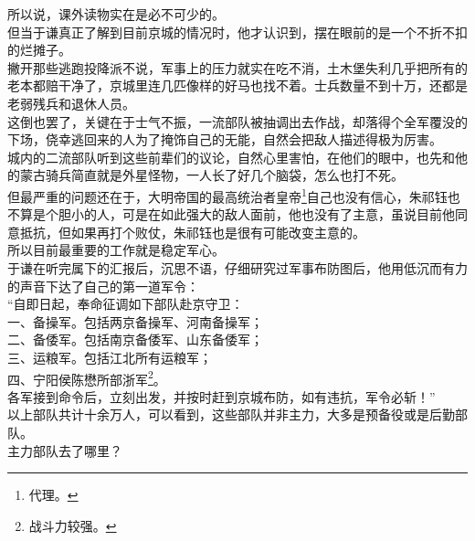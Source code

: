 \begin{multicols}{\theparacolNo}
所以说，课外读物实在是必不可少的。\\

但当于谦真正了解到目前京城的情况时，他才认识到，摆在眼前的是一个不折不扣的烂摊子。\\

撇开那些逃跑投降派不说，军事上的压力就实在吃不消，土木堡失利几乎把所有的老本都赔干净了，京城里连几匹像样的好马也找不着。士兵数量不到十万，还都是老弱残兵和退休人员。\\

这倒也罢了，关键在于士气不振，一流部队被抽调出去作战，却落得个全军覆没的下场，侥幸逃回来的人为了掩饰自己的无能，自然会把敌人描述得极为厉害。\\

城内的二流部队听到这些前辈们的议论，自然心里害怕，在他们的眼中，也先和他的蒙古骑兵简直就是外星怪物，一人长了好几个脑袋，怎么也打不死。\\

但最严重的问题还在于，大明帝国的最高统治者皇帝\footnote{代理。}自己也没有信心，朱祁钰也不算是个胆小的人，可是在如此强大的敌人面前，他也没有了主意，虽说目前他同意抵抗，但如果再打个败仗，朱祁钰也是很有可能改变主意的。\\

所以目前最重要的工作就是稳定军心。\\

于谦在听完属下的汇报后，沉思不语，仔细研究过军事布防图后，他用低沉而有力的声音下达了自己的第一道军令：\\

“自即日起，奉命征调如下部队赴京守卫：\\

一、备操军。包括两京备操军、河南备操军；\\

二、备倭军。包括南京备倭军、山东备倭军；\\

三、运粮军。包括江北所有运粮军；\\

四、宁阳侯陈懋所部浙军\footnote{战斗力较强。}。\\

各军接到命令后，立刻出发，并按时赶到京城布防，如有违抗，军令必斩！”\\

以上部队共计十余万人，可以看到，这些部队并非主力，大多是预备役或是后勤部队。\\

主力部队去了哪里？\\


\end{multicols}
